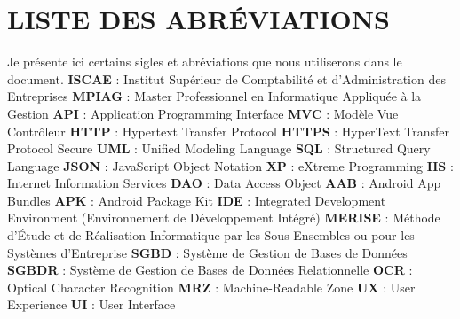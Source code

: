 \documentclass[a4paper, 12pt]{report}
\begin{document}
	\chapter*{LISTE DES ABRÉVIATIONS} \label{chap:1SIGLES ET ABREVIATIONS}
	Je présente ici certains sigles et abréviations que nous utiliserons dans le document.
	\newline\newline
	\textbf{ISCAE} : Institut Supérieur de Comptabilité et d’Administration des Entreprises \newline
	\textbf{MPIAG} : Master Professionnel en Informatique Appliquée à la Gestion \newline
	\textbf{API} : Application Programming Interface \newline
	\textbf{MVC} : Modèle Vue Contrôleur \newline
	\textbf{HTTP} : Hypertext Transfer Protocol \newline
	\textbf{HTTPS} : HyperText Transfer Protocol Secure \newline
	\textbf{UML} : Unified Modeling Language \newline
	\textbf{SQL} : Structured Query Language \newline
	\textbf{JSON} : JavaScript Object Notation \newline
	\textbf{XP} : eXtreme Programming \newline
	\textbf{IIS} : Internet Information Services \newline
	\textbf{DAO} : Data Access Object \newline
	\textbf{AAB} : Android App Bundles \newline
	\textbf{APK} : Android Package Kit \newline
	\textbf{IDE} : Integrated Development Environment (Environnement de Développement Intégré) \newline
	\textbf{MERISE} : Méthode d’Étude et de Réalisation Informatique par les Sous-Ensembles ou pour les Systèmes d’Entreprise \newline
	\textbf{SGBD} : Système de Gestion de Bases de Données \newline
	\textbf{SGBDR} : Système de Gestion de Bases de Données Relationnelle \newline
	\textbf{OCR} : Optical Character Recognition  \newline
	\textbf{MRZ} : Machine-Readable Zone   \newline
	\textbf{UX} : User Experience
	 \newline  
	\textbf{UI} : User Interface  
	\thispagestyle{empty}
	
\end{document}
